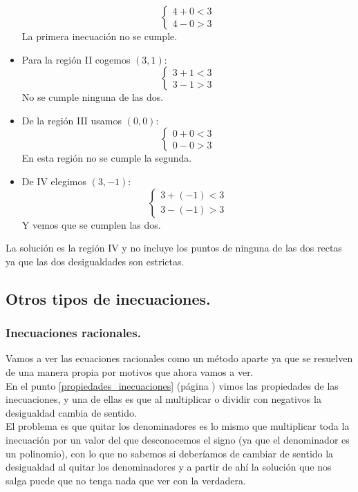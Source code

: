 \documentclass[a4paper,11pt,answers]{exam}
\begin{document}
\begin{questions}
\begin{solution}
\begin{itemize}
      \[
        \begin{cases}
          4 + 0 < 3\\
          4 - 0 > 3
        \end{cases}
      \]
      La primera inecuación no se cumple.
    \item Para la región II cogemos $(3, 1)$:
      \[
        \begin{cases}
          3 + 1 < 3\\
          3 - 1 > 3
        \end{cases}
      \]
      No se cumple ninguna de las dos.
    \item De la región III usamos $(0, 0)$:
      \[
        \begin{cases}
          0 + 0 < 3\\
          0 - 0 > 3
        \end{cases}
      \]
      En esta región no se cumple la segunda.
    \item De IV elegimos $(3, -1)$:
      \[
        \begin{cases}
          3 + (-1) < 3\\
          3 - (-1) > 3
        \end{cases}
      \]
      Y vemos que se cumplen las dos.
    \end{itemize}
    La solución es la región IV y no incluye los puntos de ninguna de las dos rectas ya que las
    dos desigualdades son estrictas.
  \end{solution}
\end{questions}
\subsection{Otros tipos de inecuaciones.}
\subsubsection{Inecuaciones racionales.} \label{inecuaciones_racionales}
Vamos a ver las ecuaciones racionales como un método aparte ya que se resuelven de una manera propia
por motivos que ahora vamos a ver.\\

En el punto \ref{propiedades_inecuaciones} (página \pageref{propiedades_inecuaciones}) vimos las propiedades
de las inecuaciones, y una de ellas es que al multiplicar o dividir con negativos la desigualdad cambia
de sentido.\\
El problema es que quitar los denominadores es lo mismo que multiplicar toda la inecuación por un valor del
que desconocemos el signo (ya que el denominador es un polinomio), con lo que no sabemos si deberíamos
de cambiar de sentido la desigualdad al quitar los denominadores y a partir de ahí la solución que nos
salga puede que no tenga nada que ver con la verdadera.\\
\end{document}
